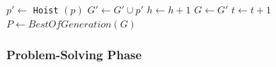 \documentclass[a4paper,12pt]{article}
\begin{document}
\begin{minipage}{.5\textwidth}
\begin{algorithm}[H]
{{{                                $p' \gets $ \texttt{Hoist} $(p)$ \;
                                $ G' \gets G' \cup p'$\;
                                $ h \gets h + 1$ \;
                            }
                            $ G \gets G'$ \;
                            $ t \gets t + 1$ \; 
                        }
                        $ P \gets BestOfGeneration(G)$ \;
                        \;
                    }
                \end{algorithm}
                \vspace{0.7cm}
            \end{minipage} 
            
        \newpage
        \subsubsection*{Problem-Solving Phase}  
\end{document}
